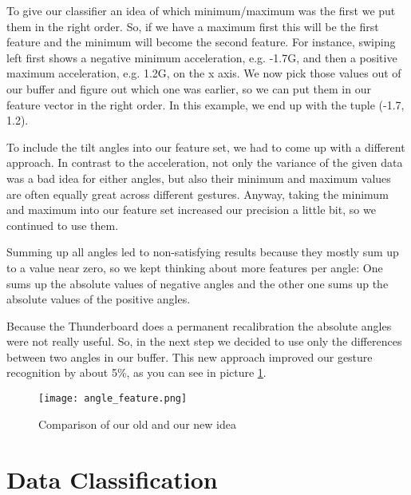 To give our classifier an idea of which minimum/maximum was the first we put them in the right order. So, if we have a maximum first this will be the first feature and the minimum will become the second feature.
For  instance,  swiping  left  first  shows  a negative  minimum  acceleration, e.g. -1.7G, and then a positive  maximum acceleration, e.g. 1.2G, on the x axis.
We now pick those values out of our buffer and figure out which one was earlier, so we can put them in our feature vector in the right order.
In  this example, we end up with the tuple (-1.7, 1.2).

To include the tilt angles into our feature set, we had to come up with a different approach.
In contrast to the acceleration, not only the variance of the given data was a bad idea for either angles, but also their minimum and maximum values are often equally great across different gestures.
Anyway, taking the minimum and maximum into our feature set increased our precision a little bit, so we continued to use them.

Summing  up  all  angles  led  to non-satisfying  results because they mostly sum up to a value near zero,  so  we  kept thinking about  more  features  per  angle:
One  sums  up  the absolute  values  of  negative  angles  and  the  other  one  sums  up  the  absolute values  of  the  positive  angles.

Because the Thunderboard does a permanent recalibration the absolute angles were not really useful. So, in the next step we decided to use only the differences between two angles in our buffer.
This new approach improved our gesture recognition by about 5\%, as you can see in picture \ref{fig:angle_feature}.

\begin{figure}[htp]
\begin{center}
  \texttt{[image: angle\_feature.png]}
\caption{Comparison of our old and our new idea}\label{fig:angle_feature}
\end{center}
\end{figure}

\newpage 

\section{Data Classification}
\label{ch:DataCollection:sec:DataClassification}

